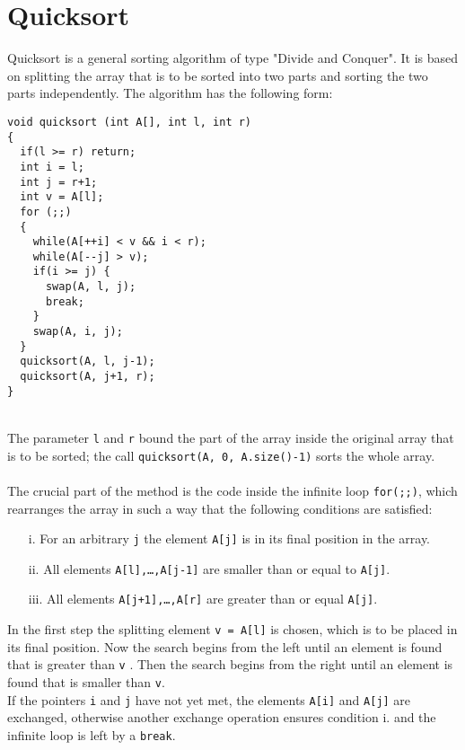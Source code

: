 \documentclass[12pt,a4paper]{article}
\begin{document}
\theoremstyle{plain}  \newtheorem{satz*}{Theorem}[]

\section*{Quicksort}

Quicksort is a general sorting algorithm of type "Divide and Conquer".
It is based on splitting the array that is to be sorted into two parts and sorting the two
parts independently. The algorithm has the following form:

\begin{verbatim}
void quicksort (int A[], int l, int r)
{
  if(l >= r) return;  
  int i = l;
  int j = r+1;
  int v = A[l];
  for (;;)
  {
    while(A[++i] < v && i < r);
    while(A[--j] > v);
    if(i >= j) {
      swap(A, l, j);    			
      break;
    }
    swap(A, i, j);
  }
  quicksort(A, l, j-1);
  quicksort(A, j+1, r);
}
\end{verbatim}
\mbox{}\\[-1ex]
The parameter {\tt l} and {\tt r} bound the part of the array inside the original array that is to be sorted;
the call {\tt quicksort(A, 0, A.size()-1)} sorts the whole array. 
\\\\[-1ex]
The crucial part of the method is the code inside the infinite loop
{\tt for(;;)}, which rearranges the array in such a way that the following conditions are satisfied:

\begin{enumerate}
\item [i.]  For an arbitrary {\tt j} the element  {\tt A[j]} is in its final position in the array.
\item [ii.]  All elements {\tt A[l],\ldots,A[j-1]} are smaller than or equal to  {\tt A[j]}.
\item [iii.] All elements {\tt A[j+1],\ldots,A[r]} are greater than or equal {\tt A[j]}.\\[-1ex]
\end{enumerate}

In the first step  the splitting element {\tt v = A[l]} is chosen,
which is to be placed in its final position. Now the search begins from the left until an element 
is found that is greater than {\tt v} . Then the search begins from the right  until an element 
is found that is smaller than {\tt v}. \\
If the pointers {\tt i} and {\tt j} have not yet met, the elements
{\tt A[i]} and {\tt A[j]} are exchanged, otherwise another exchange operation ensures
condition i. and the infinite loop is left by a {\tt break}. \\
\end{document}
